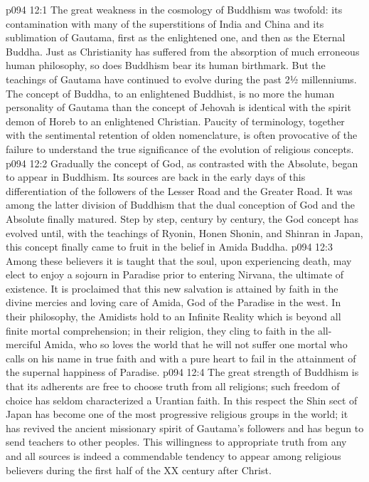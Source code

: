 \vs p094 12:1 The great weakness in the cosmology of Buddhism was twofold: its contamination with many of the superstitions of India and China and its sublimation of Gautama, first as the enlightened one, and then as the Eternal Buddha. Just as Christianity has suffered from the absorption of much erroneous human philosophy, so does Buddhism bear its human birthmark. But the teachings of Gautama have continued to evolve during the past 2½ millenniums. The concept of Buddha, to an enlightened Buddhist, is no more the human personality of Gautama than the concept of Jehovah is identical with the spirit demon of Horeb to an enlightened Christian. Paucity of terminology, together with the sentimental retention of olden nomenclature, is often provocative of the failure to understand the true significance of the evolution of religious concepts.
\vs p094 12:2 \pc Gradually the concept of God, as contrasted with the Absolute, began to appear in Buddhism. Its sources are back in the early days of this differentiation of the followers of the Lesser Road and the Greater Road. It was among the latter division of Buddhism that the dual conception of God and the Absolute finally matured. Step by step, century by century, the God concept has evolved until, with the teachings of Ryonin, Honen Shonin, and Shinran in Japan, this concept finally came to fruit in the belief in Amida Buddha.
\vs p094 12:3 Among these believers it is taught that the soul, upon experiencing death, may elect to enjoy a sojourn in Paradise prior to entering Nirvana, the ultimate of existence. It is proclaimed that this new salvation is attained by faith in the divine mercies and loving care of Amida, God of the Paradise in the west. In their philosophy, the Amidists hold to an Infinite Reality which is beyond all finite mortal comprehension; in their religion, they cling to faith in the all\hyp{}merciful Amida, who so loves the world that he will not suffer one mortal who calls on his name in true faith and with a pure heart to fail in the attainment of the supernal happiness of Paradise.
\vs p094 12:4 The great strength of Buddhism is that its adherents are free to choose truth from all religions; such freedom of choice has seldom characterized a Urantian faith. In this respect the Shin sect of Japan has become one of the most progressive religious groups in the world; it has revived the ancient missionary spirit of Gautama’s followers and has begun to send teachers to other peoples. This willingness to appropriate truth from any and all sources is indeed a commendable tendency to appear among religious believers during the first half of the XX century after Christ.
